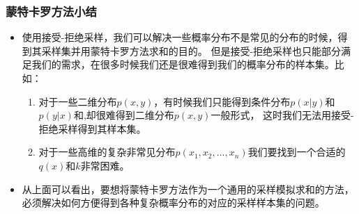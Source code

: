 \begin{frame}
  \frametitle{蒙特卡罗方法小结}
  \begin{itemize}
    \item 使用接受-拒绝采样，我们可以解决一些概率分布不是常见的分布的时候，得到其采样集并用蒙特卡罗方法求和的目的。
    但是接受-拒绝采样也只能部分满足我们的需求，在很多时候我们还是很难得到我们的概率分布的样本集。比如：
    \begin{enumerate}
      \item 对于一些二维分布$p(x, y)$，有时候我们只能得到条件分布$p(x|y)$和$p(y|x)$和,却很难得到二维分布$p(x,y)$一般形式，
      这时我们无法用接受-拒绝采样得到其样本集。
      \item 对于一些高维的复杂非常见分布$p(x_1, x_2, ..., x_n)$我们要找到一个合适的$q(x)$和$k$非常困难。
    \end{enumerate}
    \item 从上面可以看出，要想将蒙特卡罗方法作为一个通用的采样模拟求和的方法，必须解决如何方便得到各种复杂概率分布的对应的采样样本集的问题。
  \end{itemize}

\end{frame}